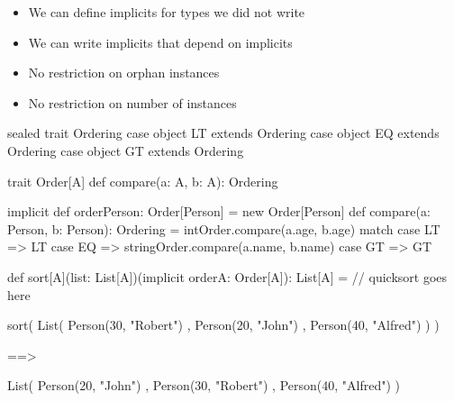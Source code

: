 \documentclass[usenames,dvipsnames,svgnames,table,aspectratio=169,mathserif]{beamer}
\newcommand{\nl}{\vspace{\baselineskip}}
\newcommand{\pnl}{\pause \nl}
\begin{document}
\begin{frame}
\begin{itemize}
\item We can define implicits for types we did not write
\item We can write implicits that depend on implicits
\end{itemize}
\end{frame}


\begin{frame}
\begin{itemize}
\item No restriction on orphan instances
\item No restriction on number of instances
\end{itemize}
\end{frame}


\begin{frame}[fragile]
\begin{scalacode}
sealed trait Ordering
case object LT extends Ordering
case object EQ extends Ordering
case object GT extends Ordering
\end{scalacode}

\pnl

\begin{scalacode}
trait Order[A] {
  def compare(a: A, b: A): Ordering
}
\end{scalacode}

\pnl

\begin{scalacode}
implicit def orderPerson: Order[Person] = new Order[Person] {
  def compare(a: Person, b: Person): Ordering =
    intOrder.compare(a.age, b.age) match {
      case LT => LT
      case EQ => stringOrder.compare(a.name, b.name)
      case GT => GT
    }
}
\end{scalacode}
\end{frame}


\begin{frame}[fragile]
\begin{scalacode}
def sort[A](list: List[A])(implicit orderA: Order[A]): List[A] = {
  // quicksort goes here
}
\end{scalacode}
\end{frame}


\begin{frame}[fragile]
\begin{scalacode}
sort(
  List(
    Person(30, "Robert")
  , Person(20, "John")
  , Person(40, "Alfred")
  )
)
\end{scalacode}

\pnl

\begin{scalacode}
==>

List(
  Person(20, "John")
, Person(30, "Robert")
, Person(40, "Alfred")
)
\end{scalacode}
\end{frame}
\end{document}
